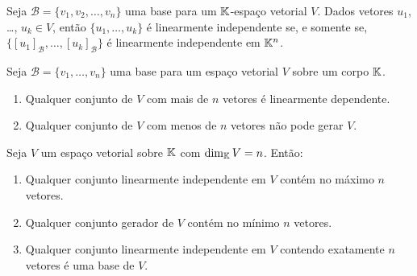 \documentclass{beamer}
\begin{document}
\begin{frame}
  \begin{teorema}
    Seja $\mathcal{B} = \{v_1, v_2, \dots, v_n\}$ uma base \pause para um $\mathbb{K}$-espaço vetorial $V$. \pause Dados vetores $u_1$, \dots, $u_k \in V$, \pause então $\{u_1, \dots, u_k\}$ é linearmente independente \pause se, e somente se, \pause $\{[u_1]_\mathcal{B}, \dots, [u_k]_\mathcal{B}\}$ \pause é linearmente independente em $\mathbb{K}^n$.
  \end{teorema}
\end{frame}

\begin{frame}
  \begin{teorema}
    Seja $\mathcal{B} = \{v_1, \dots, v_n\}$ uma base \pause para um espaço vetorial $V$ sobre um corpo $\mathbb{K}$. \pause
    \begin{enumerate}[label={\roman*})]
      \vspace{.2cm}

      \item Qualquer conjunto  de $V$ com mais de $n$ vetores \pause é linearmente dependente. \pause

      \vspace{1cm}

      \item Qualquer conjunto de $V$ com menos de $n$ vetores \pause não pode gerar $V$.
    \end{enumerate}
  \end{teorema}
\end{frame}


\begin{frame}
  \begin{teorema}
    Seja $V$ um espaço vetorial sobre $\mathbb{K}$ \pause com $\dim_{\mathbb{K}} V = n$. \pause Então: \pause
    \begin{enumerate}[label={\roman*})]
      \vspace{.2cm}

      \item Qualquer conjunto linearmente independente em $V$ \pause contém no máximo $n$ vetores. \pause

      \vspace{1cm}

      \item Qualquer conjunto gerador de $V$ \pause contém no mínimo $n$ vetores. \pause

      \vspace{1cm}

      \item Qualquer conjunto linearmente independente em $V$ \pause contendo exatamente $n$ vetores \pause é uma base de $V$.

      \seti

     \end{enumerate}
  \end{teorema}
\end{frame}
\end{document}

